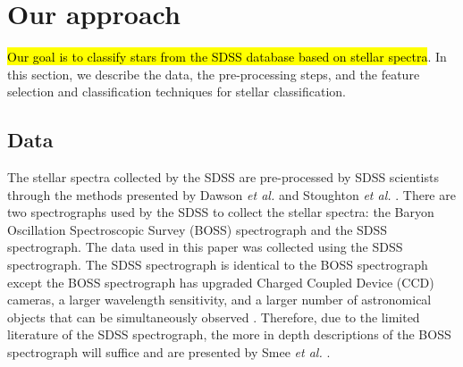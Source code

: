 \documentclass[conference]{IEEEtran}
\DeclareRobustCommand{\hlorange}[1]{{\sethlcolor{orange}\hl{#1}}}
\begin{document}
\section{Our approach}\label{sec:approach}

\hlorange{Our goal is to classify stars from the SDSS database based on stellar spectra}. In this section, we describe the data, the pre-processing steps, and the feature selection and classification techniques for stellar classification. 
		
	\subsection{Data}\label{sec:data}

	The stellar spectra collected by the SDSS are pre-processed by SDSS scientists through the methods presented by Dawson \textit{et al. }\cite{Dawson} and Stoughton \textit{et al.}  \cite{Stoughton}. There are two spectrographs used by the SDSS to collect the stellar spectra: the Baryon Oscillation Spectroscopic Survey (BOSS) spectrograph and the SDSS spectrograph. The data used in this paper was collected using the SDSS spectrograph. The SDSS spectrograph is identical to the BOSS spectrograph except the BOSS spectrograph has upgraded Charged Coupled Device (CCD) cameras, a larger wavelength sensitivity, and a larger number of astronomical objects that can be simultaneously observed \cite{boss}. Therefore, due to the limited literature of the SDSS spectrograph, the more in depth descriptions of the BOSS spectrograph will suffice and are presented by Smee \textit{et al.} \cite{Smee}.  
\end{document}

